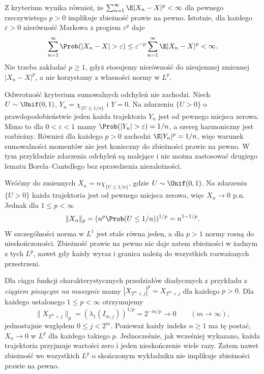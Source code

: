 \begin{uwaga}
Z kryterium wynika również, że
$\sum_{n=1}^\infty\E|X_n-X|^p<\infty$ dla pewnego
rzeczywistego $p>0$ implikuje zbieżność prawie na pewno.
Istotnie, dla każdego $\varepsilon>0$ nierówność Markowa
z progiem $\varepsilon^p$ daje
\[
\sum_{n=1}^\infty\Prob(|X_n-X|>\varepsilon)
\leq\varepsilon^{-p}\sum_{n=1}^\infty\E|X_n-X|^p
<\infty.
\]
Nie trzeba zakładać $p\geq1$, gdyż stosujemy nierówność
do nieujemnej zmiennej $|X_n-X|^p$, a nie korzystamy
z własności normy w $L^p$.

Odwrotność kryterium sumowalnych odchyleń nie zachodzi.
Niech $U\sim\Unif(0,1)$, $Y_n=\chi_{\{U\leq1/n\}}$
i $Y=0$. Na zdarzeniu $\{U>0\}$ o prawdopodobieństwie
jeden każda trajektoria $Y_n$ jest od pewnego miejsca
zerowa. Mimo to dla $0<\varepsilon<1$ mamy
$\Prob(|Y_n|>\varepsilon)=1/n$, a szereg harmoniczny
jest rozbieżny. Również dla każdego $p>0$ zachodzi
$\E|Y_n|^p=1/n$, więc warunek sumowalności momentów
nie jest konieczny do zbieżności prawie na pewno.
W tym przykładzie zdarzenia odchyleń są malejące
i nie można zastosować drugiego lematu Borela--Cantellego
bez sprawdzenia niezależności.
\end{uwaga}

\begin{przyklad}
Wróćmy do zmiennych $X_n=n\chi_{\{U\leq1/n\}}$,
gdzie $U\sim\Unif(0,1)$.
Na zdarzeniu $\{U>0\}$ każda trajektoria jest
od pewnego miejsca zerowa, więc $X_n\to0$ p.n.
Jednak dla $1\leq p<\infty$
\[
\|X_n\|_p=(n^p\Prob(U\leq1/n))^{1/p}
=n^{1-1/p}.
\]
W szczególności norma w $L^1$ jest stale równa jeden,
a dla $p>1$ normy rosną do nieskończoności.
Zbieżność prawie na pewno nie daje zatem zbieżności
w żadnym z tych $L^p$, nawet gdy każdy wyraz i granica
należą do wszystkich rozważanych przestrzeni.
\end{przyklad}

\begin{przyklad}
Dla ciągu funkcji charakterystycznych przedziałów
diadycznych z przykładu z \emph{ciągiem piszącym na maszynie}
mamy $|X_{2^m+j}|^p=X_{2^m+j}$ dla każdego $p>0$.
Dla każdego ustalonego $1\leq p<\infty$ otrzymujemy
\[
\|X_{2^m+j}\|_p
=(\lambda_1(I_{m,j}))^{1/p}=2^{-m/p}\longrightarrow0
\qquad (m\to\infty),
\]
jednostajnie względem $0\leq j<2^m$.
Ponieważ każdy indeks $n\geq1$ ma tę postać,
$X_n\to0$ w $L^p$ dla każdego takiego $p$.
Jednocześnie, jak wcześniej wykazano, każda trajektoria
przyjmuje wartości zero i jeden nieskończenie wiele razy.
Zatem nawet zbieżność we wszystkich $L^p$ o skończonym
wykładniku nie implikuje zbieżności prawie na pewno.
\end{przyklad}

